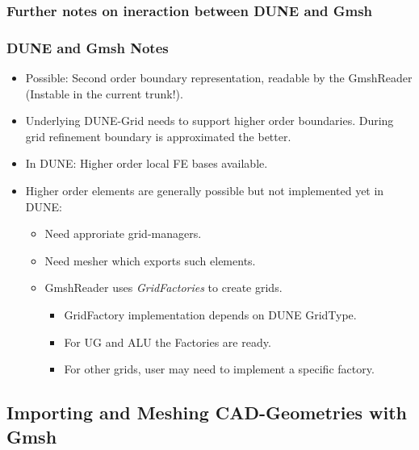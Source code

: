 \subsubsection*{Further notes on ineraction between DUNE and Gmsh}

\begin{frame}
  \frametitle{DUNE and Gmsh Notes}
  \begin{itemize}
    \item Possible: Second order boundary representation, readable by the
      GmshReader (Instable in the current trunk!).
    \item Underlying DUNE-Grid needs to support higher order boundaries. During grid
      refinement boundary is approximated the better.
    \item In DUNE: Higher order local FE bases available.
    \item Higher order elements are generally possible but not
      implemented yet in DUNE:
      \begin{itemize}
        \item Need approriate grid-managers.
        \item Need mesher which exports such elements.
        \item GmshReader uses \emph{GridFactories} to create grids.
          \begin{itemize}
            \item GridFactory implementation depends on DUNE GridType.
            \item For UG and ALU the Factories are ready.
            \item For other grids, user may need to implement a specific factory.
          \end{itemize}
      \end{itemize}
  \end{itemize}
\end{frame}

\subsection{Importing and Meshing CAD-Geometries with Gmsh}

